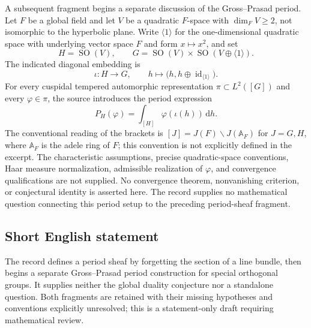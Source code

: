 \documentclass[11pt]{article}
\begin{document}
A subsequent fragment begins a separate discussion of the Gross--Prasad period. Let \(F\) be a global field and let \(V\) be a quadratic \(F\)-space with \(\dim_F V\geq 2\), not isomorphic to the hyperbolic plane. Write \(\langle 1\rangle\) for the one-dimensional quadratic space with underlying vector space \(F\) and form \(x\mapsto x^2\), and set
\[
 H=\operatorname{SO}(V),\qquad
 G=\operatorname{SO}(V)\times\operatorname{SO}(V\oplus\langle1\rangle).
\]
The indicated diagonal embedding is
\[
 \iota:H\longrightarrow G,\qquad h\longmapsto\bigl(h,h\oplus\operatorname{id}_{\langle1\rangle}\bigr).
\]
For every cuspidal tempered automorphic representation \(\pi\subset L^2([G])\) and every \(\varphi\in\pi\), the source introduces the period expression
\[
 P_H(\varphi)=\int_{[H]}\varphi(\iota(h))\,\mathrm{d}h.
\]
The conventional reading of the brackets is \([J]=J(F)\backslash J(\mathbb A_F)\) for \(J=G,H\), where \(\mathbb A_F\) is the adele ring of \(F\); this convention is not explicitly defined in the excerpt. The characteristic assumptions, precise quadratic-space conventions, Haar measure normalization, admissible realization of \(\varphi\), and convergence qualifications are not supplied. No convergence theorem, nonvanishing criterion, or conjectural identity is asserted here. The record supplies no mathematical question connecting this period setup to the preceding period-sheaf fragment.
\subsection{Short English statement}
The record defines a period sheaf by forgetting the section of a line bundle, then begins a separate Gross--Prasad period construction for special orthogonal groups. It supplies neither the global duality conjecture nor a standalone question. Both fragments are retained with their missing hypotheses and conventions explicitly unresolved; this is a statement-only draft requiring mathematical review.
\end{document}
